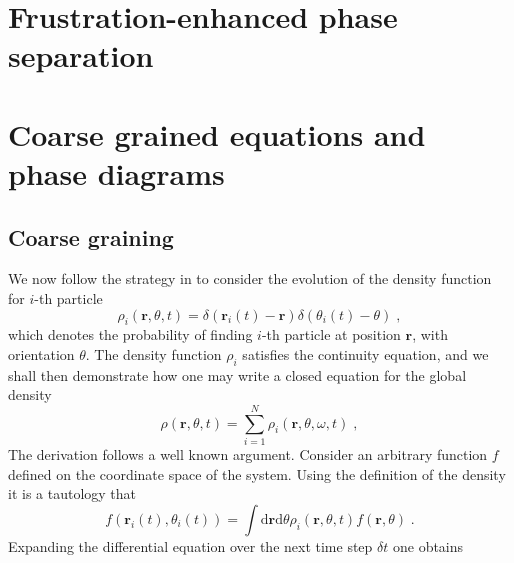 \documentclass{article}
\begin{document}
\section{\label{sec:behaviors}Frustration-enhanced phase separation}


\section{\label{sec:analysis}Coarse grained equations and phase diagrams}

\subsection{Coarse graining}
We now follow the strategy in \cite{DavidSDean_1996} to consider the evolution of the density function for $i$-th particle
\begin{equation}
    \rho _i\left( \mathbf{r},\theta ,t \right) =\delta \left( \mathbf{r}_i\left( t \right) -\mathbf{r} \right) \delta \left( \theta _i\left( t \right) -\theta \right) \;, 
\end{equation}
which denotes the probability of finding $i$-th particle at position $\mathbf{r}$, with orientation $\theta$. The density function $\rho _i$ satisfies the continuity equation, and we shall then demonstrate how one may write a closed equation for the global density
\begin{equation}
    \rho \left( \mathbf{r},\theta ,t \right) =\sum_{i=1}^N{\rho _i\left( \mathbf{r},\theta ,\omega ,t \right)}\;,
    \label{eq:coarseDensitySub2}
\end{equation}
The derivation follows a well known argument. Consider an arbitrary function $f$ defined on the coordinate space of the system. Using the definition of the density it is a tautology
that
\begin{equation}
    \label{eq:arbitraryFunction}
    f\left( \mathbf{r}_i\left( t \right) ,\theta _i\left( t \right) \right) =\int{\mathrm{d}\mathbf{r}\mathrm{d}\theta \rho _i\left( \mathbf{r},\theta ,t \right) f\left( \mathbf{r},\theta \right)}\;.
\end{equation}
Expanding the differential equation over the next time step $\delta t$ one obtains
\end{document}

